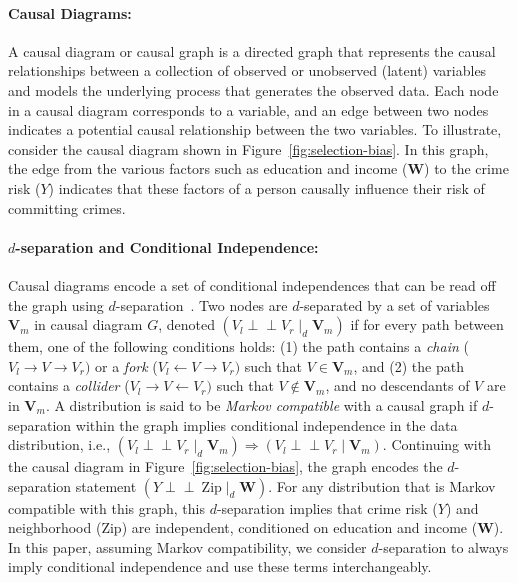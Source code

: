 \documentclass[11pt]{article}
\newcommand{\indep}{\mbox{$\perp\!\!\!\perp$}}
\begin{document}
\paragraph{Causal Diagrams:} A causal diagram or causal graph is a directed graph that represents the causal relationships between a collection of observed or unobserved (latent) variables and models the underlying process that generates the observed data. Each node in a causal diagram corresponds to a variable, and an edge between two nodes indicates a potential causal relationship between the two variables.  To illustrate, consider the causal diagram shown in Figure~\ref{fig:selection-bias}. In this graph, the edge from the various factors such as education and income ($\boldsymbol{W}$) to the crime risk ($Y$) indicates that these factors of a person causally influence their risk of committing crimes. 

\vspace{-.3cm}
\paragraph{$d$-separation and Conditional Independence:} Causal diagrams encode a set of conditional independences that can be read off the graph using $d$-separation~\cite{pearl2009causality}. 
Two nodes are $d$-separated by a set of variables $\bm{V}_m$ in causal diagram $G$, denoted $(V_l \indep V_r \mid_d \bm{V}_m)$ if for every path between them, one of the following conditions holds:
(1) the path contains a {\em chain} ($V_l \rightarrow V \rightarrow V_r)$  or a {\em fork} ($V_l \leftarrow V \rightarrow V_r)$ such that $V \in \bm{V}_m$, and (2) the path contains a {\em collider} ($V_l \rightarrow V \leftarrow V_r)$ such that $V  \not\in \bm{V}_m$,  and no descendants of $V$ are in $\bm{V}_m$. 
A distribution is said to be {\em Markov compatible} with a causal graph if \( d \)-separation within the graph implies conditional independence in the data distribution, i.e., \( (V_l \indep V_r \mid_d \bm{V}_m) \Rightarrow (V_l \indep V_r \mid \bm{V}_m) \). 
Continuing with the causal diagram in Figure~\ref{fig:selection-bias}, the graph encodes the \( d \)-separation statement \( (Y \indep \ \text{Zip} \mid_d \boldsymbol{W}) \).
For any distribution that is Markov compatible with this graph, this \( d \)-separation implies that crime risk (\( Y \)) and neighborhood (\( \text{Zip} \)) are independent, conditioned on education and income (\( \boldsymbol{W} \)). 
In this paper, assuming Markov compatibility, we consider \( d \)-separation to always imply conditional independence and use these terms interchangeably.
\end{document}

